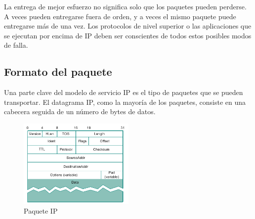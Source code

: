 La entrega de mejor esfuerzo no significa solo que los paquetes pueden perderse. A veces pueden entregarse fuera de orden, y a veces el mismo paquete puede entregarse más de una vez. Los protocolos de nivel superior o las aplicaciones que se ejecutan por encima de IP deben ser conscientes de todos estos posibles modos de falla.

\subsection{Formato del paquete}
Una parte clave del modelo de servicio IP es el tipo de paquetes que se pueden transportar. El datagrama IP, como la mayoría de los paquetes, consiste en una cabecera seguida de un número de bytes de datos.


\begin{figure}[H]
	\centering
	\includegraphics[width=0.5\textwidth
]{images/ip-frame.png}
	\caption[Paquete IP]{Paquete IP}
	\label{fig:ip-frame}
\end{figure}

